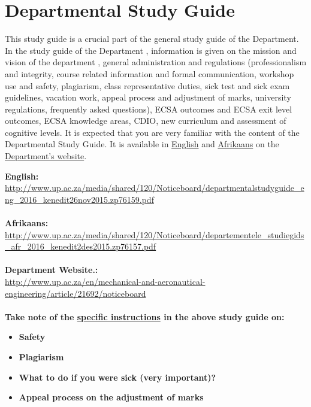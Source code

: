 \section{Departmental Study Guide} \label{sec:dep_study_guide}
    This study guide is a crucial part of the general study guide of the
    Department. In the study guide of the Department , information is given
    on the mission and vision of the department , general administration and
    regulations (professionalism and integrity, course related information
    and formal communication, workshop use and safety, plagiarism, class
    representative duties, sick test and sick exam guidelines, vacation work,
    appeal process and adjustment of marks, university regulations, frequently
    asked questions), ECSA outcomes and ECSA exit level outcomes, ECSA
    knowledge areas, CDIO, new curriculum and assessment of cognitive levels.
    It is expected that you are very familiar with the content of the
    Departmental Study Guide. It is available in
    \href{http://www.up.ac.za/media/shared/120/Noticeboard/departmentalstudyguide_eng_2016_kenedit26nov2015.zp76159.pdf}{English}
    and
    \href{http://www.up.ac.za/media/shared/120/Noticeboard/departementele_studiegids_afr_2016_kenedit2des2015.zp76157.pdf}{Afrikaans}
    on the
    \href{http://www.up.ac.za/en/mechanical-and-aeronautical-engineering/article/21692/noticeboard}{Department’s website}.

    \noindent
    \textbf{English:} \\
    \url{http://www.up.ac.za/media/shared/120/Noticeboard/departmentalstudyguide_eng_2016_kenedit26nov2015.zp76159.pdf} \\~\\
    \textbf{Afrikaans:} \\
    \url{http://www.up.ac.za/media/shared/120/Noticeboard/departementele_studiegids_afr_2016_kenedit2des2015.zp76157.pdf} \\~\\
    \textbf{Department Website.:} \\
    \url{http://www.up.ac.za/en/mechanical-and-aeronautical-engineering/article/21692/noticeboard} \\~\\

    \noindent
    \textbf{Take note of the \uline{specific instructions} in the above study guide on:}
    \begin{itemize}
        \item \textbf{Safety}
        \item \textbf{Plagiarism}
        \item \textbf{What to do if you were sick (very important)?}
        \item \textbf{Appeal process on the adjustment of marks}
    \end{itemize}
